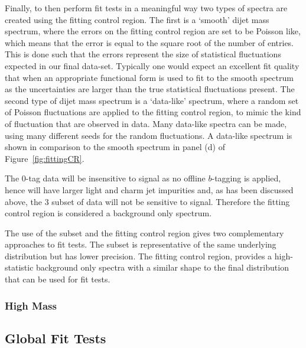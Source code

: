 Finally, to then perform fit tests in a meaningful way two types of spectra are created using the fitting control region.
The first is a `smooth' dijet mass spectrum, where the errors on the fitting control region are set to be Poisson like, which
means that the error is equal to the square root of the number of entries.
This is done such that the errors represent the  size of statistical fluctuations expected in our final data-set.
Typically one would expect an excellent fit quality that when an appropriate functional form is used
to fit to the smooth spectrum as the uncertainties are larger than the true statistical fluctuations present.
The second type of dijet mass spectrum is a `data-like' spectrum,
where a random set of Poisson fluctuations are applied to the fitting control region,
to mimic the kind of fluctuation that are observed in data.
Many data-like spectra can be made, using many different seeds for the random fluctuations.
A data-like spectrum is shown in comparison to the smooth spectrum in panel (d) of Figure~\ref{fig:fittingCR}.

The 0-tag data will be insensitive to signal as no offline $b$-tagging is applied, hence will have larger light and charm jet impurities
and, as has been discussed above, the  3 \ifb{} subset of data will not be sensitive to signal.
Therefore the fitting control region is considered a background only spectrum.

The use of the subset and the fitting control region gives two complementary approaches to fit tests.
The subset is representative of the same underlying distribution but has lower precision.
The fitting control region, provides a high-statistic background only spectra with a
similar shape to the final distribution that can be used for fit tests.



\subsubsection{High Mass}
\label{sec:highmass_bkgsample}

\newpage
\subsection{Global Fit Tests}
\label{sec:globalfit}

